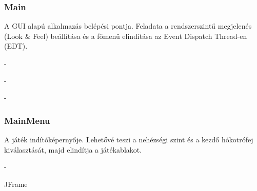 \subsubsection{Main}
\begin{class-template-responsibility}
    A GUI alapú alkalmazás belépési pontja. Feladata a rendszerszintű megjelenés (Look \& Feel) beállítása és a főmenü elindítása az Event Dispatch Thread-en (EDT).
\end{class-template-responsibility}
\begin{class-template-interface}
    -
\end{class-template-interface}
\begin{class-template-baseclass}
    -
\end{class-template-baseclass}
\begin{class-template-attribute}
    -
\end{class-template-attribute}
\begin{class-template-method}
\end{class-template-method} 

\subsubsection{MainMenu}
\begin{class-template-responsibility}
    A játék indítóképernyője. Lehetővé teszi a nehézségi szint és a kezdő hókotrófej kiválasztását, majd elindítja a játékablakot.
\end{class-template-responsibility}
\begin{class-template-interface}
    -
\end{class-template-interface}
\begin{class-template-baseclass}
    JFrame
\end{class-template-baseclass}
\begin{class-template-attribute}
\end{class-template-attribute}\begin{class-template-method}
\end{class-template-method}

